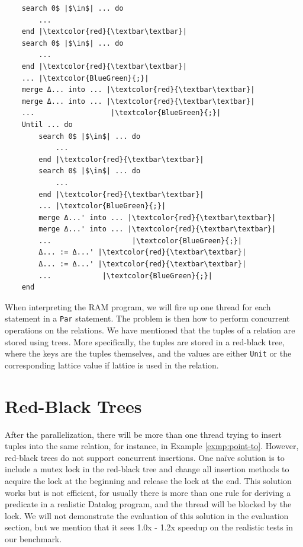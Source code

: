 \documentclass[11pt]{report}
\theoremstyle{definition}
\begin{document}
\begin{verbatim}
    search 0$ |$\in$| ... do
        ...
    end |\textcolor{red}{\textbar\textbar}|
    search 0$ |$\in$| ... do
        ...
    end |\textcolor{red}{\textbar\textbar}|
    ... |\textcolor{BlueGreen}{;}|
    merge Δ... into ... |\textcolor{red}{\textbar\textbar}|
    merge Δ... into ... |\textcolor{red}{\textbar\textbar}|
    ...                  |\textcolor{BlueGreen}{;}|
    Until ... do
        search 0$ |$\in$| ... do
            ...
        end |\textcolor{red}{\textbar\textbar}|
        search 0$ |$\in$| ... do
            ...
        end |\textcolor{red}{\textbar\textbar}|
        ... |\textcolor{BlueGreen}{;}|
        merge Δ...' into ... |\textcolor{red}{\textbar\textbar}|
        merge Δ...' into ... |\textcolor{red}{\textbar\textbar}|
        ...                   |\textcolor{BlueGreen}{;}|
        Δ... := Δ...' |\textcolor{red}{\textbar\textbar}|
        Δ... := Δ...' |\textcolor{red}{\textbar\textbar}|
        ...            |\textcolor{BlueGreen}{;}|
    end 
\end{verbatim}

When interpreting the RAM program, we will fire up one thread for each statement in a \texttt{Par} statement. The problem is then how to perform concurrent operations on the relations. We have mentioned that the tuples of a relation are stored using trees. More specifically, the tuples are stored in a red-black tree, where the keys are the tuples themselves, and the values are either \texttt{Unit} or the corresponding lattice value if lattice is used in the relation.

\section{Red-Black Trees}

After the parallelization, there will be more than one thread trying to insert tuples into the same relation, for instance, in Example \ref{exmp:point-to}. However, red-black trees do not support concurrent insertions. One naïve solution is to include a mutex lock in the red-black tree and change all insertion methods to acquire the lock at the beginning and release the lock at the end. This solution works but is not efficient, for usually there is more than one rule for deriving a predicate in a realistic Datalog program, and the thread will be blocked by the lock. We will not demonstrate the evaluation of this solution in the evaluation section, but we mention that it sees 1.0x - 1.2x speedup on the realistic tests in our benchmark.
\end{document}
